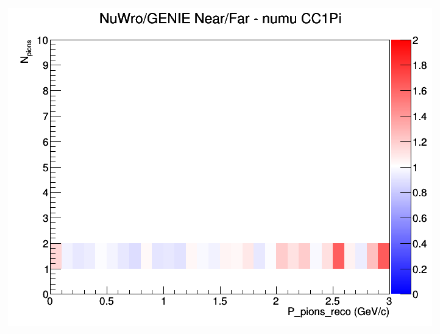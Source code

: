 \documentclass[12pt]{article}
\begin{document}
\begin{figure}[h]
\endminipage
{}
\includegraphics[width=\linewidth]{eff_N_P/FGT/pions/ratios/CC1Pi_NuWro_GENIE_numu_NF_N_P.png}
\endminipage
\newline
\end{figure}
\clearpage
\end{document}
